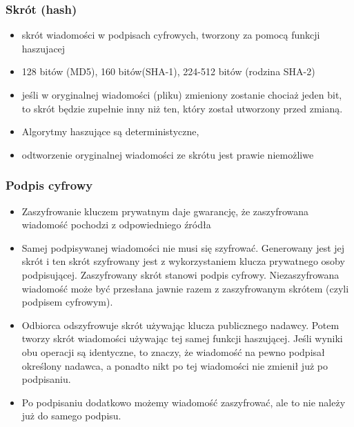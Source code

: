 \documentclass[../main.tex]{subfiles}
\begin{document}
\subsubsection{Skrót (hash)}
\begin{itemize}
    \item skrót wiadomości w podpisach cyfrowych, tworzony za pomocą funkcji haszujacej
    \item 128 bitów (MD5), 160 bitów(SHA-1), 224-512 bitów (rodzina SHA-2)
    \item jeśli w oryginalnej wiadomości (pliku)
    zmieniony zostanie chociaż jeden bit, to skrót będzie zupełnie inny niż ten, który został
    utworzony przed zmianą.
    \item  Algorytmy haszujące są deterministyczne,
    \item odtworzenie oryginalnej wiadomości ze skrótu jest prawie niemożliwe
\end{itemize}



\subsubsection{Podpis cyfrowy}
\begin{itemize}
    \item Zaszyfrowanie kluczem prywatnym daje gwarancję, że zaszyfrowana wiadomość pochodzi z
    odpowiedniego źródła
    \item Samej podpisywanej wiadomości nie musi się szyfrować. Generowany jest jej skrót
    i ten skrót szyfrowany jest z wykorzystaniem klucza
    prywatnego osoby podpisującej. Zaszyfrowany skrót stanowi podpis cyfrowy. Niezaszyfrowana wiadomość może być przesłana jawnie razem z zaszyfrowanym skrótem
    (czyli podpisem cyfrowym).
    \item Odbiorca odszyfrowuje skrót używając klucza
    publicznego nadawcy. Potem tworzy skrót wiadomości używając tej samej funkcji haszującej. Jeśli wyniki
    obu operacji są identyczne, to znaczy, że wiadomość na pewno
    podpisał określony nadawca, a ponadto nikt po tej wiadomości nie zmienił już po podpisaniu.
    \item Po podpisaniu dodatkowo możemy wiadomość zaszyfrować, ale to nie
    należy już do samego podpisu.
\end{itemize}
\end{document}
